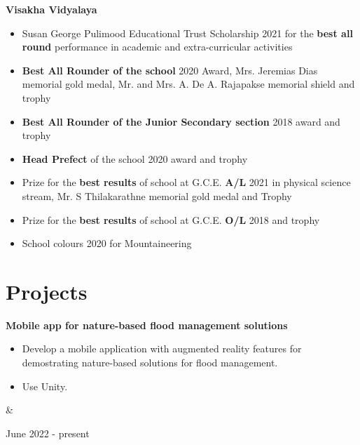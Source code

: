 \documentclass[10pt, a4paper]{article}
\newenvironment{highlights}{
        \begin{itemize}[
                topsep=0pt,
                parsep=0.10 cm,
                partopsep=0pt,
                itemsep=0pt,
                after=\vspace{-1\baselineskip},
                leftmargin=0.4 cm + 3pt
            ]
    }{
        \end{itemize}
    } %
\let\originalTabularx\tabularx
\let\originalEndTabularx\endtabularx
\renewenvironment{tabularx}{\bgroup\centering\originalTabularx}{\originalEndTabularx\par\egroup}
\begin{document}
        \textbf{Visakha Vidyalaya}  \begin{highlights}
        \item Susan George Pulimood Educational Trust Scholarship 2021 for the \textbf{best all round} performance in academic and extra-curricular activities
	   \item \textbf{Best All Rounder of the school} 2020 Award, Mrs. Jeremias Dias memorial gold medal, Mr. and Mrs. A. De A. Rajapakse memorial shield and trophy
	   \item \textbf{Best All Rounder of the Junior Secondary section} 2018 award and trophy
		\item \textbf{Head Prefect} of the school 2020 award and trophy
		\item Prize for the \textbf{best results} of school at G.C.E. \textbf{A/L} 2021 in physical science stream, Mr. S Thilakarathne memorial gold medal and Trophy
		\item Prize for the \textbf{best results} of school at G.C.E. \textbf{O/L} 2018 and trophy
		\item School colours 2020 for Mountaineering
	\end{highlights}
        \par\endgroup
    
    \vspace{0.4 cm}
    
    \section{Projects}

        \begin{tabularx}{
            \textwidth-0.4 cm-0.13cm
        }{
            K{0.2 cm}
            R{4.1 cm}
        }
            \textbf{Mobile app for nature-based flood management solutions}

            \vspace{0.10 cm}

            \begin{highlights}
                \item Develop a mobile application with augmented reality features for demostrating nature-based solutions for flood management.
                \item Use Unity.
            \end{highlights}
            &
            

            June 2022 - present
        \end{tabularx}
\end{document}

